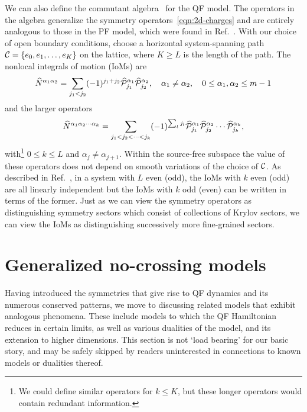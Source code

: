 We can also define the commutant algebra~\cite{Moudgalya2022Commutant} for the QF model. The operators in the algebra generalize the symmetry operators~\eqref{eqn:2d-charges} and are entirely analogous to those in the PF model, which were found in Ref.~\cite{Moudgalya2022Commutant}. With our choice of open boundary conditions, choose a horizontal system-spanning path $\cal{C} = \{e_0,e_1,\dots, e_K\}$ on the lattice, where $K\ge L$ is the length of the path. The nonlocal integrals of motion (IoMs) are
\begin{align*}
\hat{N}^{\alpha_1\alpha_2} = \sum_{j_1<j_2}(-1)^{j_1+j_2} \hat{\cal{P}}_{j_1}^{\alpha_1} \hat{\cal{P}}_{j_2}^{\alpha_2}, \quad \alpha_1 \ne \alpha_2, \quad 0\le \alpha_1,\alpha_2 \le m-1
\end{align*}
and the larger operators
\begin{align}
\hat{N}^{\alpha_1\alpha_2\cdots \alpha_k} = \sum_{j_1<j_2<\cdots<j_k}(-1)^{\sum_l j_l} \hat{\cal{P}}_{j_1}^{\alpha_1} \hat{\cal{P}}_{j_2}^{\alpha_2} \cdots \hat{\cal{P}}_{j_k}^{\alpha_k},
\end{align}
with\footnote{We could define similar operators for $k\le K$, but these longer operators would contain redundant information.} $0\le k \le L$ and $\alpha_j \ne \alpha_{j+1}$. Within the source-free subspace the value of these operators does not depend on smooth variations of the choice of $\cal{C}$. As described in Ref.~\cite{Moudgalya2022Commutant}, in a system with $L$ even (odd), the IoMs with $k$ even (odd) are all linearly independent but the IoMs with $k$ odd (even) can be written in terms of the former. Just as we can view the symmetry operators as distinguishing symmetry sectors which consist of collections of Krylov sectors, we can view the IoMs as distinguishing successively more fine-grained sectors.


\section{Generalized no-crossing models} \label{sec:generalized}


Having introduced the symmetries that give rise to QF dynamics and its numerous conserved patterns, we move to discussing related models that exhibit analogous phenomena.
These include models to which the QF Hamiltonian reduces in certain limits, as well as various dualities of the model, and its extension to higher dimensions. This section is not `load bearing' for our basic story, and may be safely skipped by readers uninterested in connections to known models or dualities thereof. 

